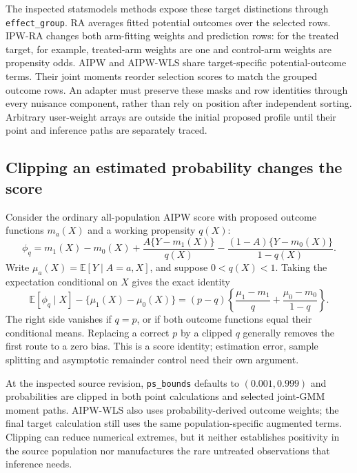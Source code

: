 The inspected statsmodels methods expose these target distinctions through
\texttt{effect\_group}. RA averages fitted potential outcomes over the
selected rows. IPW-RA changes both arm-fitting weights and prediction rows:
for the treated target, for example, treated-arm weights are one and
control-arm weights are propensity odds. AIPW and AIPW-WLS share
target-specific potential-outcome terms. Their joint moments reorder
selection scores to match the grouped outcome rows. An adapter must preserve
these masks and row identities through every nuisance component, rather
than rely on position after independent sorting. Arbitrary user-weight
arrays are outside the initial proposed profile until their point and
inference paths are separately traced.~\citep{exec20_python_effect_source}

\subsection{Clipping an estimated probability changes the score}
\label{exec20:pyfx-clipping}
Consider the ordinary all-population AIPW score with proposed outcome
functions $m_a(X)$ and a working propensity $q(X)$:
\begin{equation}
 \phi_q=m_1(X)-m_0(X)+\frac{A\{Y-m_1(X)\}}{q(X)}
       -\frac{(1-A)\{Y-m_0(X)\}}{1-q(X)}.
 \label{exec20:pyfx-score}
\end{equation}
Write $\mu_a(X)=\mathbb E[Y\mid A=a,X]$, and suppose $0<q(X)<1$.
Taking the expectation conditional on $X$ gives the exact identity
\begin{equation}
 \mathbb E[\phi_q\mid X]-\{\mu_1(X)-\mu_0(X)\}
 =(p-q)\left\{\frac{\mu_1-m_1}{q}
                 +\frac{\mu_0-m_0}{1-q}\right\}.
 \label{exec20:pyfx-bias}
\end{equation}
The right side vanishes if $q=p$, or if both outcome functions equal their
conditional means. Replacing a correct $p$ by a clipped $q$ generally removes
the first route to a zero bias. This is a score identity; estimation error,
sample splitting and asymptotic remainder control need their own argument.

At the inspected source revision, \texttt{ps\_bounds} defaults to
$(0.001,0.999)$ and probabilities are clipped in both point calculations
and selected joint-GMM moment paths. AIPW-WLS also uses probability-derived
outcome weights; the final target calculation still uses the same
population-specific augmented terms. Clipping can reduce numerical
extremes, but it neither establishes positivity in the source population
nor manufactures the rare untreated observations that inference needs.
\citep{exec20_python_effect_source}

